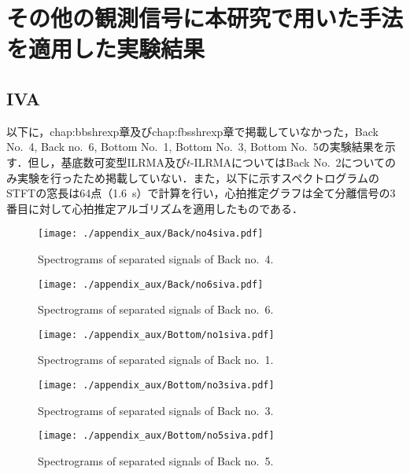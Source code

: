 \chapter{その他の観測信号に本研究で用いた手法を適用した実験結果}
\label{chap:ineq}

\section{IVA}
以下に，{chap:bbshrexp}章及び{chap:fbsshrexp}章で掲載していなかった，Back No.~4, Back no.~6, Bottom No.~1, Bottom No.~3, Bottom No.~5の実験結果を示す．但し，基底数可変型ILRMA及び$t$-ILRMAについてはBack No.~2についてのみ実験を行ったため掲載していない．また，以下に示すスペクトログラムのSTFTの窓長は64点（1.6~s）で計算を行い，心拍推定グラフは全て分離信号の3番目に対して心拍推定アルゴリズムを適用したものである．

\begin{figure}[tb]
\centering
\texttt{[image: ./appendix\_aux/Back/no4siva.pdf]}
\caption{Spectrograms of separated signals of Back no.~4.}
\end{figure}

\begin{figure}[tb]
\centering
\texttt{[image: ./appendix\_aux/Back/no6siva.pdf]}
\caption{Spectrograms of separated signals of Back no.~6.}
\end{figure}

\begin{figure}[tb]
\centering
\texttt{[image: ./appendix\_aux/Bottom/no1siva.pdf]}
\caption{Spectrograms of separated signals of Back no.~1.}
\end{figure}

\begin{figure}[tb]
\centering
\texttt{[image: ./appendix\_aux/Bottom/no3siva.pdf]}
\caption{Spectrograms of separated signals of Back no.~3.}
\end{figure}

\begin{figure}[tb]
\centering
\texttt{[image: ./appendix\_aux/Bottom/no5siva.pdf]}
\caption{Spectrograms of separated signals of Back no.~5.}
\end{figure}

